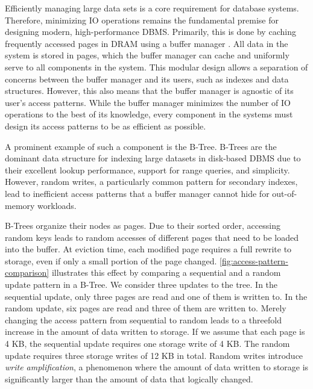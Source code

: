 Efficiently managing large data sets is a core requirement for database systems. 
Therefore, minimizing \ac{IO} operations remains the fundamental premise for designing modern, high-performance \ac{DBMS}.
Primarily, this is done by caching frequently accessed pages in \ac{DRAM} using a buffer manager \cite{leis2018leanstore}.
All data in the system is stored in pages, which the buffer manager can cache and uniformly serve to all components in the system.
This modular design allows a separation of concerns between the buffer manager and its users, such as indexes and data structures.
However, this also means that the buffer manager is agnostic of its user's access patterns.
While the buffer manager minimizes the number of \ac{IO} operations to the best of its knowledge, every component in the systems must design its access patterns to be as efficient as possible. 

A prominent example of such a component is the B-Tree. 
B-Trees are the dominant data structure for indexing large datasets in disk-based \ac{DBMS} due to their excellent lookup performance, support for range queries, and simplicity.
However, random writes, a particularly common pattern for secondary indexes, lead to inefficient access patterns that a buffer manager cannot hide for out-of-memory workloads.

B-Trees organize their nodes as pages. Due to their sorted order, accessing random keys leads to random accesses of different pages that need to be loaded into the buffer.
At eviction time, each modified page requires a full rewrite to storage, even if only a small portion of the page changed.
\autoref{fig:access-pattern-comparison} illustrates this effect by comparing a sequential and a random update pattern in a B-Tree.
We consider three updates to the tree.
In the sequential update, only three pages are read and one of them is written to.
In the random update, six pages are read and three of them are written to.
Merely changing the access pattern from sequential to random leads to a threefold increase in the amount of data written to storage.
If we assume that each page is 4 KB, the sequential update requires one storage write of 4 KB.
The random update requires three storage writes of 12 KB in total.
Random writes introduce \emph{write amplification}, a phenomenon where the amount of data written to storage is significantly larger than the amount of data that logically changed.

